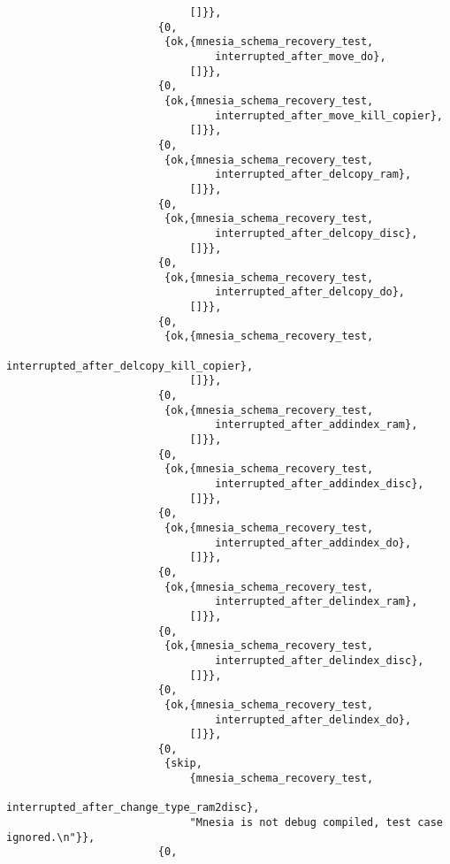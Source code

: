 \begin{verbatim}
                             []}},
                        {0,
                         {ok,{mnesia_schema_recovery_test,
                                 interrupted_after_move_do},
                             []}},
                        {0,
                         {ok,{mnesia_schema_recovery_test,
                                 interrupted_after_move_kill_copier},
                             []}},
                        {0,
                         {ok,{mnesia_schema_recovery_test,
                                 interrupted_after_delcopy_ram},
                             []}},
                        {0,
                         {ok,{mnesia_schema_recovery_test,
                                 interrupted_after_delcopy_disc},
                             []}},
                        {0,
                         {ok,{mnesia_schema_recovery_test,
                                 interrupted_after_delcopy_do},
                             []}},
                        {0,
                         {ok,{mnesia_schema_recovery_test,
                                 interrupted_after_delcopy_kill_copier},
                             []}},
                        {0,
                         {ok,{mnesia_schema_recovery_test,
                                 interrupted_after_addindex_ram},
                             []}},
                        {0,
                         {ok,{mnesia_schema_recovery_test,
                                 interrupted_after_addindex_disc},
                             []}},
                        {0,
                         {ok,{mnesia_schema_recovery_test,
                                 interrupted_after_addindex_do},
                             []}},
                        {0,
                         {ok,{mnesia_schema_recovery_test,
                                 interrupted_after_delindex_ram},
                             []}},
                        {0,
                         {ok,{mnesia_schema_recovery_test,
                                 interrupted_after_delindex_disc},
                             []}},
                        {0,
                         {ok,{mnesia_schema_recovery_test,
                                 interrupted_after_delindex_do},
                             []}},
                        {0,
                         {skip,
                             {mnesia_schema_recovery_test,
                                 interrupted_after_change_type_ram2disc},
                             "Mnesia is not debug compiled, test case ignored.\n"}},
                        {0,

\end{verbatim}
